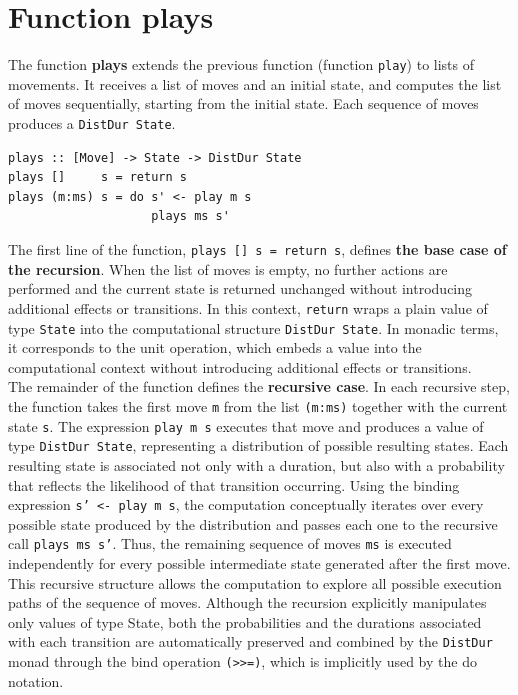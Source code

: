 \documentclass[a4paper,12pt]{report}
\begin{document}
\section{Function plays}
The function \textbf{plays} extends the previous function (function
\texttt{play}) to lists of movements. It receives a list of moves
and an initial state, and computes the list of moves sequentially,
starting from the initial state. Each sequence of moves produces a
\texttt{DistDur State}.
\begin{verbatim}
plays :: [Move] -> State -> DistDur State 
plays []     s = return s
plays (m:ms) s = do s' <- play m s
                    plays ms s'
\end{verbatim}
The first line of the function, \texttt{plays [] s = return s},
defines \textbf{the base case of the recursion}. When the list of moves
is empty, no further actions are performed and the current state is
returned unchanged without introducing additional effects or transitions.
In this context, \texttt{return} wraps a plain value of type \texttt{State}
into the computational structure \texttt{DistDur State}. In monadic terms,
it corresponds to the unit operation, which embeds a value into the
computational context without introducing additional effects or transitions.
\\[1em]
The remainder of the function defines the \textbf{recursive case}.
In each recursive step, the function takes the first move \texttt{m}
from the list \texttt{(m:ms)} together with the current state \texttt{s}.
The expression \texttt{play m s} executes that move and produces
a value of type \texttt{DistDur State}, representing a distribution of
possible resulting states. Each resulting state is associated not only with
a duration, but also with a probability that reflects the likelihood of
that transition occurring.
Using the binding expression \texttt{s' <- play m s}, the computation
conceptually iterates over every possible state produced by the
distribution and passes each one to the recursive call \texttt{plays ms s'}.
Thus, the remaining sequence of moves \texttt{ms} is executed independently
for every possible intermediate state generated after the first move.
This recursive structure allows the computation to explore
all possible execution paths of the sequence of moves.
Although the recursion explicitly manipulates only values
of type State, both the probabilities and the durations
associated with each transition are automatically preserved and
combined by the \texttt{DistDur} monad through the bind operation
\texttt{(>>=)}, which is implicitly used by the do notation.
\end{document}
